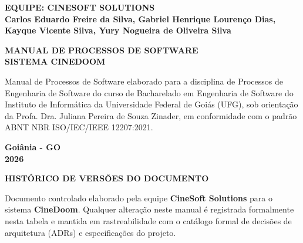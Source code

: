 \documentclass[12pt,a4paper]{article}
\begin{document}
\begin{titlepage}
  \centering
  \textbf{EQUIPE: CINESOFT SOLUTIONS}\\
  \vspace{0.4cm}
  \textbf{Carlos Eduardo Freire da Silva, Gabriel Henrique Lourenço Dias,}\\
  \textbf{Kayque Vicente Silva, Yury Nogueira de Oliveira Silva}\\
  \vspace{3.8cm}
  
  \MakeUppercase{\textbf{Manual de Processos de Software}}\\
  \MakeUppercase{\textbf{Sistema CineDoom}}\\
  \vspace{2.2cm}
  
  \hfill
  \begin{minipage}{0.52\textwidth}
    \begin{singlespace}
      \small
      Manual de Processos de Software elaborado para a disciplina de Processos de Engenharia de Software do curso de Bacharelado em Engenharia de Software do Instituto de Informática da Universidade Federal de Goiás (UFG), sob orientação da Profa. Dra. Juliana Pereira de Souza Zinader, em conformidade com o padrão ABNT NBR ISO/IEC/IEEE 12207:2021.
    \end{singlespace}
  \end{minipage}
  \vfill
  
  \textbf{Goiânia - GO}\\
  \textbf{2026}
\end{titlepage}

\newpage
\thispagestyle{empty}
\begin{center}
  \MakeUppercase{\textbf{Histórico de Versões do Documento}}
\end{center}
\vspace{0.8cm}

\noindent Documento controlado elaborado pela equipe \textbf{CineSoft Solutions} para o sistema \textbf{CineDoom}. Qualquer alteração neste manual é registrada formalmente nesta tabela e mantida em rastreabilidade com o catálogo formal de decisões de arquitetura (ADRs) e especificações do projeto.
\end{document}
